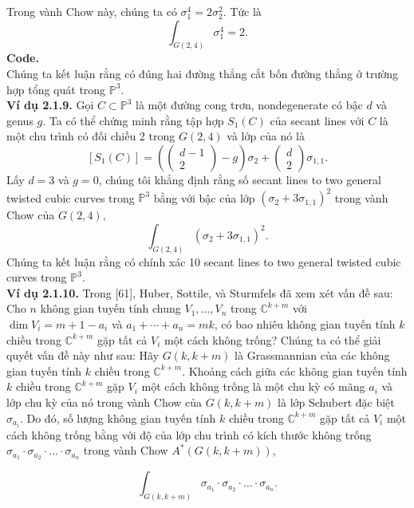 \documentclass[11pt,a4paper]{book}
\begin{document}
Trong vành Chow này, chúng ta có \( \sigma_1^4=2 \sigma_2^2 \). Tức là
\[
\int_{G(2,4)} \sigma_1^4=2.
\]
\textbf{Code.}\\
Chúng ta kết luận rằng có đúng hai đường thẳng cắt bốn đường thẳng ở trường hợp tổng quát trong \( \mathbb{P}^3 \).\\
\textbf{Ví dụ 2.1.9.} Gọi \( C \subset \mathbb{P}^3 \) là một đường cong trơn, nondegenerate có bậc \( d \) và genus \( g \). Ta có thể chứng minh rằng tập hợp \( S_1(C) \) của secant lines với \( C \) là một chu trình có đối chiều 2 trong \( G(2,4) \) và lớp của nó là
\[\left[S_1(C)\right]=\left(\left(\begin{array}{c}
	d-1 \\
	2
\end{array}\right)-g\right) \sigma_2+\left(\begin{array}{l}
	d \\
	2
\end{array}\right) \sigma_{1,1}.
\]
Lấy \( d=3 \) và \( g=0 \), chúng tôi khẳng định rằng số secant lines to two general twisted cubic curves trong \( \mathbb{P}^3 \) bằng với bậc của lớp \( \left(\sigma_2+3 \sigma_{1,1}\right)^2 \) trong vành Chow của \( G(2,4) \),
\[\int_{G(2,4)}\left(\sigma_2+3 \sigma_{1,1}\right)^2.\]
Chúng ta kết luận rằng có chính xác 10 secant lines to two general twisted cubic curves trong \( \mathbb{P}^3 \).\\
\textbf{Ví dụ 2.1.10.} Trong [61], Huber, Sottile, và Sturmfels đã xem xét vấn đề sau: Cho \( n \) không gian tuyến tính chung \( V_1, \ldots, V_n \) trong \( \mathbb{C}^{k+m} \) với \( \operatorname{dim} V_i=m+1-a_i \) và \( a_1+\cdots+a_n=m k \), có bao nhiêu không gian tuyến tính \( k \) chiều trong \( \mathbb{C}^{k+m} \) gặp tất cả \( V_i \) một cách không trống? Chúng ta có thể giải quyết vấn đề này như sau: Hãy \( G(k, k+m) \) là Grassmannian của các không gian tuyến tính \( k \) chiều trong \( \mathbb{C}^{k+m} \). Khoảng cách giữa các không gian tuyến tính \( k \) chiều trong \( \mathbb{C}^{k+m} \) gặp \( V_i \) một cách không trống là một chu kỳ có mãng \( a_i \) và lớp chu kỳ của nó trong vành Chow của \( G(k, k+m) \) là lớp Schubert đặc biệt \( \sigma_{a_i} \). Do đó, số lượng không gian tuyến tính \( k \) chiều trong \( \mathbb{C}^{k+m} \) gặp tất cả \( V_i \) một cách không trống bằng với độ của lớp chu trình có kích thước không trống \( \sigma_{a_1} \cdot \sigma_{a_2} \cdot \ldots \cdot \sigma_{a_n} \) trong vành Chow \( A^*(G(k, k+m)) \),

\[
\int_{G(k, k+m)} \sigma_{a_1} \cdot \sigma_{a_2} \cdot \ldots \cdot \sigma_{a_n}.
\]
\end{document}
